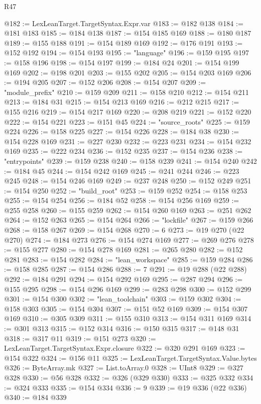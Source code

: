 \begin{lexlean}{R47}
\begin{coremodule}
@182 := LexLeanTarget.TargetSyntax.Expr.var
@183 := @182 @138
@184 := @181 @183
@185 := @184 @138
@187 := @154 @185 @169
@188 := @180 @187
@189 := @155 @188
@191 := @154 @189 @169
@192 := @176 @191
@193 := @152 @192
@194 := @154 @193
@195 := "language"
@196 := @159 @195
@197 := @158 @196
@198 := @154 @197
@199 := @184 @24
@201 := @154 @199 @169
@202 := @198 @201
@203 := @155 @202
@205 := @154 @203 @169
@206 := @194 @205
@207 := @152 @206
@208 := @154 @207
@209 := "module_prefix"
@210 := @159 @209
@211 := @158 @210
@212 := @154 @211
@213 := @184 @31
@215 := @154 @213 @169
@216 := @212 @215
@217 := @155 @216
@219 := @154 @217 @169
@220 := @208 @219
@221 := @152 @220
@222 := @154 @221
@223 := @151 @45
@224 := "source_roots"
@225 := @159 @224
@226 := @158 @225
@227 := @154 @226
@228 := @184 @38
@230 := @154 @228 @169
@231 := @227 @230
@232 := @223 @231
@234 := @154 @232 @169
@235 := @222 @234
@236 := @152 @235
@237 := @154 @236
@238 := "entrypoints"
@239 := @159 @238
@240 := @158 @239
@241 := @154 @240
@242 := @184 @45
@244 := @154 @242 @169
@245 := @241 @244
@246 := @223 @245
@248 := @154 @246 @169
@249 := @237 @248
@250 := @152 @249
@251 := @154 @250
@252 := "build_root"
@253 := @159 @252
@254 := @158 @253
@255 := @154 @254
@256 := @184 @52
@258 := @154 @256 @169
@259 := @255 @258
@260 := @155 @259
@262 := @154 @260 @169
@263 := @251 @262
@264 := @152 @263
@265 := @154 @264
@266 := "lockfile"
@267 := @159 @266
@268 := @158 @267
@269 := @154 @268
@270 := 6
@273 := @19 @270 (@22 @270)
@274 := @184 @273
@276 := @154 @274 @169
@277 := @269 @276
@278 := @155 @277
@280 := @154 @278 @169
@281 := @265 @280
@282 := @152 @281
@283 := @154 @282
@284 := "lean_workspace"
@285 := @159 @284
@286 := @158 @285
@287 := @154 @286
@288 := 7
@291 := @19 @288 (@22 @288)
@292 := @184 @291
@294 := @154 @292 @169
@295 := @287 @294
@296 := @155 @295
@298 := @154 @296 @169
@299 := @283 @298
@300 := @152 @299
@301 := @154 @300
@302 := "lean_toolchain"
@303 := @159 @302
@304 := @158 @303
@305 := @154 @304
@307 := @151 @52 @169
@309 := @154 @307 @169
@310 := @305 @309
@311 := @155 @310
@313 := @154 @311 @169
@314 := @301 @313
@315 := @152 @314
@316 := @150 @315
@317 := @148 @31
@318 := @317 @11
@319 := @151 @273
@320 := LexLeanTarget.TargetSyntax.Expr.closure
@322 := @320 @291 @169
@323 := @154 @322
@324 := @156 @11
@325 := LexLeanTarget.TargetSyntax.Value.bytes
@326 := ByteArray.mk
@327 := List.toArray.{0}
@328 := UInt8
@329 := @327 @328
@330 := @56 @328
@332 := @326 (@329 @330)
@333 := @325 @332
@334 := @324 @333
@335 := @154 @334
@336 := 9
@339 := @19 @336 (@22 @336)
@340 := @184 @339

\end{coremodule}
\end{lexlean}
